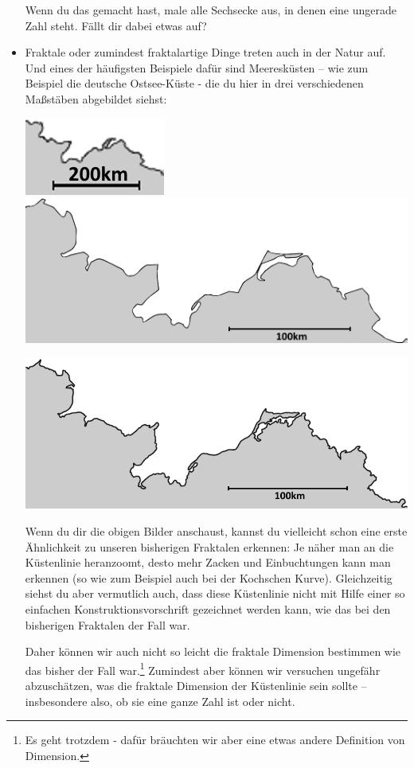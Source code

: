 \documentclass[a4paper,ngerman,12pt]{scrartcl}
\theoremstyle{definition}
\theoremstyle{plain}
\theoremstyle{remark}
\begin{document}
\begin{itemize}
		Wenn du das gemacht hast, male alle Sechsecke aus, in denen eine ungerade Zahl steht. Fällt dir dabei etwas auf?
		
	\item Fraktale oder zumindest fraktalartige Dinge treten auch in der Natur auf. Und eines der häufigsten Beispiele dafür sind Meeresküsten -- wie zum Beispiel die deutsche Ostsee-Küste - die du hier in drei verschiedenen Maßstäben abgebildet siehst:
	
	\begin{center}
		\includegraphics[width=.25\textwidth]{Bilder/Ostsee1.png}
		\includegraphics[width=.65\textwidth]{Bilder/Ostsee2.png}
		
		\includegraphics[width=.9\textwidth]{Bilder/Ostsee3.png}
	\end{center}

	Wenn du dir die obigen Bilder anschaust, kannst du vielleicht schon eine erste Ähnlichkeit zu unseren bisherigen Fraktalen erkennen: Je näher man an die Küstenlinie heranzoomt, desto mehr Zacken und Einbuchtungen kann man erkennen (so wie zum Beispiel auch bei der Kochschen Kurve). Gleichzeitig siehst du aber vermutlich auch, dass diese Küstenlinie nicht mit Hilfe einer so einfachen Konstruktionsvorschrift gezeichnet werden kann, wie das bei den bisherigen Fraktalen der Fall war.
	
	Daher können wir auch nicht so leicht die fraktale Dimension bestimmen wie das bisher der Fall war.\footnote{Es geht trotzdem - dafür bräuchten wir aber eine etwas andere Definition von Dimension.} Zumindest aber können wir versuchen ungefähr abzuschätzen, was die fraktale Dimension der Küstenlinie sein sollte -- insbesondere also, ob sie eine ganze Zahl ist oder nicht.
	

\end{itemize}
\end{document}

